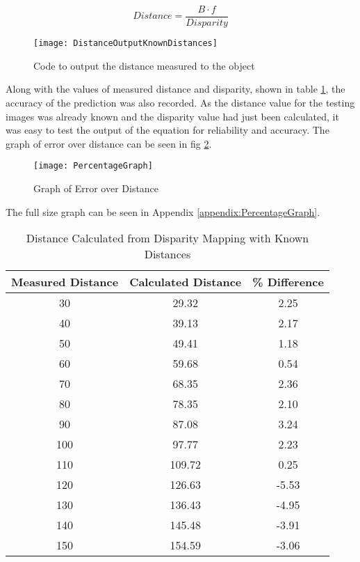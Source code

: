 \documentclass[conference]{IEEEtran}
\begin{document}
\begin{equation} \label{eq:Disparity_Equation_rearranged_2}
Distance = \frac{B \cdot f}{Disparity}
\end{equation}

\begin{figure}[H]
\centerline{\texttt{[image: DistanceOutputKnownDistances]}}
\caption{Code to output the distance measured to the object}
\label{fig:DistanceOutputKnownDistances}
\end{figure}

Along with the values of measured distance and disparity, shown in table \ref{table:distance_values_for_known_values}, the accuracy of the prediction was also recorded. As the distance value for the testing images was already known and the disparity value had just been calculated, it was easy to test the output of the equation for reliability and accuracy. The graph of error over distance can be seen in fig \ref{fig:PercentageGraph}.

\begin{figure}[H]
\centerline{\texttt{[image: PercentageGraph]}}
\caption{Graph of Error over Distance}
\label{fig:PercentageGraph}
\end{figure}

The full size graph can be seen in Appendix \ref{appendix:PercentageGraph}.

\begin{table}
\begin{center}
\caption{Distance Calculated from Disparity Mapping with Known Distances}
\begin{tabular}{ || c || c || c || }
\hline
 Measured Distance & Calculated Distance & \% Difference\\ 
\hline
 30 & 29.32 & 2.25 \\  
\hline
 40 & 39.13 & 2.17 \\  
\hline
 50 & 49.41 & 1.18 \\  
\hline
 60 & 59.68 & 0.54 \\  
\hline
 70 & 68.35 & 2.36 \\  
\hline
 80 & 78.35 & 2.10 \\  
\hline
 90 & 87.08 & 3.24 \\  
\hline
 100 & 97.77 & 2.23 \\  
\hline
 110 & 109.72 & 0.25 \\  
\hline
 120 & 126.63 & -5.53 \\  
\hline
 130 & 136.43 & -4.95 \\  
\hline
 140 & 145.48 & -3.91 \\  
\hline
 150 & 154.59 & -3.06 \\  
\hline

\end{tabular}
\label{table:distance_values_for_known_values}
\end{center}
\end{table}
\end{document}
